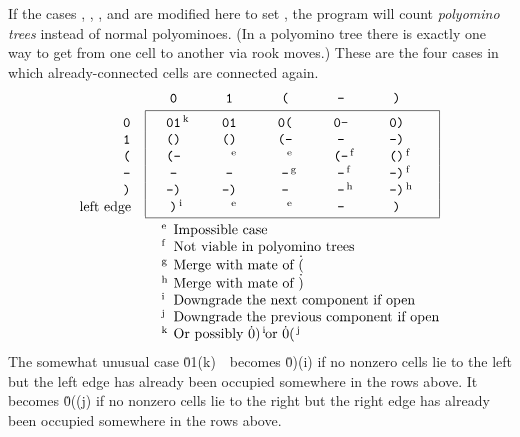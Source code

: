If the cases , , , and 
are modified here to set , the program will count
{\it polyomino trees\/} instead of normal polyominoes. (In a
polyomino tree there is exactly one way to get from one cell to another
via rook moves.) These are the four cases in which already-connected
cells are connected again.
$$\vbox{\offinterlineskip
\halign{\strut\hfil\tt#\quad&\vrule#&
\hbox to4em{\hfil\tt#\hfil}&
\hbox to4em{\hfil\tt#\hfil}&
\hbox to4em{\hfil\tt#\hfil}&
\hbox to4em{\hfil\tt#\hfil}&
\hbox to4em{\hfil\tt#\hfil}&
\vrule#\cr
&\omit&0&1&(&-&)\cr
\noalign{\vskip2pt}
\omit&&\multispan5\hrulefill&\cr
\omit&height3pt&&&&&&\cr
0&&01\sp(k)&01&    0(&0-\relax&0)\relax&\cr
1&&()&    ()&(-\relax&--\relax&-)\relax&\cr
(&&(-&\sp(e)&  \sp(e)&(-\sp(f)&()\sp(f)&\cr
-&&--&    --&--\sp(g)&--\sp(f)&-)\sp(f)&\cr
)&&-)&    -)&--\relax&--\sp(h)&-)\sp(h)&\cr
\rm left edge&&)\sp(i)&\sp(e)&\sp(e)&-&)&\cr
\omit&height1pt&&&&&&\cr
\omit&&\multispan5\hrulefill&\cr
\noalign{\smallskip}
\key(e) Impossible case\hfil\cr
\key(f) Not viable in polyomino trees\hfil\cr
\key(g) Merge with mate of \.(\hfil\cr
\key(h) Merge with mate of \.)\hfil\cr
\key(i) Downgrade the next component if open\hfil\cr
\key(j) Downgrade the previous component if open\hfil\cr
\key(k) Or possibly \.{0)\sp(i)} or \.{0(\sp(j)}\hfil\cr
}}$$
The somewhat unusual case \.{01\sp(k)}\ \ becomes \.{0)\sp(i)} if
no nonzero cells lie to the left but the left edge has already
been occupied somewhere in the rows above. It becomes \.{0(\sp(j)}
if no nonzero cells lie to the right but the right edge has already
been occupied somewhere in the rows above.

